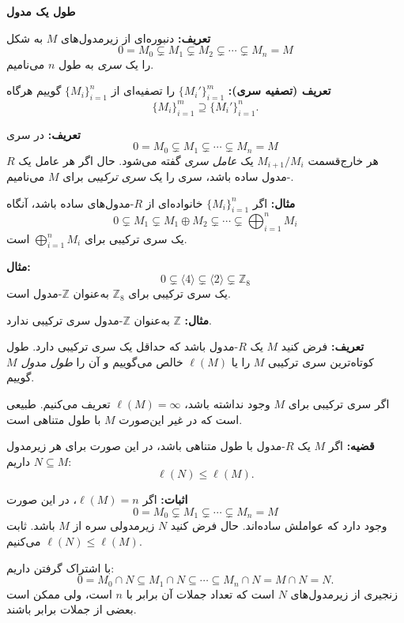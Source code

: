 \section{}




\textbf{طول یک مدول}

\textbf{تعریف:} دنبوره‌ای از زیرمدول‌های $M$ به شکل
\[
    0 = M_0 \subsetneq M_1 \subsetneq M_2 \subsetneq \cdots \subsetneq M_n = M
\]
را یک \textit{سری} به طول $n$ می‌نامیم.

\textbf{تعریف (تصفیه سری):} $\{ M_i' \}_{i=1}^m$ را تصفیه‌ای از $\{ M_i \}_{i=1}^n$ گوییم هرگاه
\[
    \{ M_i \}_{i=1}^m \supseteq \{ M_i' \}_{i=1}^n.
\]

\textbf{تعریف:} در سری
\[
    0 = M_0 \subsetneq M_1 \subsetneq \cdots \subsetneq M_n = M
\]
هر خارج‌قسمت $M_{i+1} / M_i$ یک \textit{عامل سری} گفته می‌شود. حال اگر هر عامل یک $R$-مدول ساده باشد، سری را یک \textit{سری ترکیبی} برای $M$ می‌نامیم.

\textbf{مثال:}
اگر $\{ M_i \}_{i=1}^n$ خانواده‌ای از $R$-مدول‌های ساده باشد، آنگاه
\[
    0 \subsetneq M_1 \subsetneq M_1 \oplus M_2 \subsetneq \cdots \subsetneq \bigoplus_{i=1}^n M_i
\]
یک سری ترکیبی برای $\bigoplus_{i=1}^n M_i$ است.

\textbf{مثال:}
\[
    0 \subsetneq \langle 4 \rangle \subsetneq \langle 2 \rangle \subsetneq \mathbb{Z}_8
\]
یک سری ترکیبی برای $\mathbb{Z}_8$ به‌عنوان $\mathbb{Z}$-مدول است.

\textbf{مثال:}
$\mathbb{Z}$ به‌عنوان $\mathbb{Z}$-مدول سری ترکیبی ندارد.


\textbf{تعریف:} فرض کنید $M$ یک $R$-مدول باشد که حداقل یک سری ترکیبی دارد.
طول کوتاه‌ترین سری ترکیبی $M$ را یا $\ell(M)$ خالص می‌گوییم و آن را \textit{طول مدول $M$} گوییم.

اگر سری ترکیبی برای $M$ وجود نداشته باشد، $\ell(M) = \infty$ تعریف می‌کنیم.
طبیعی است که در غیر این‌صورت $M$ با طول متناهی است.

\textbf{قضیه:} اگر $M$ یک $R$-مدول با طول متناهی باشد، در این صورت برای هر زیرمدول $N \subseteq M$ داریم:
\[
    \ell(N) \leq \ell(M).
\]

\textbf{اثبات:} اگر $\ell(M) = n$، در این صورت
\[
    0 = M_0 \subsetneq M_1 \subsetneq \cdots \subsetneq M_n = M
\]
وجود دارد که عواملش ساده‌اند. حال فرض کنید $N$ زیرمدولی سره از $M$ باشد. ثابت می‌کنیم $\ell(N) \leq \ell(M)$.

با اشتراک گرفتن داریم:
\[
    0 = M_0 \cap N \subseteq M_1 \cap N \subseteq \cdots \subseteq M_n \cap N = M \cap N = N.
\]
زنجیری از زیرمدول‌های $N$ است که تعداد جملات آن برابر با $n$ است، ولی ممکن است بعضی از جملات برابر باشند.

